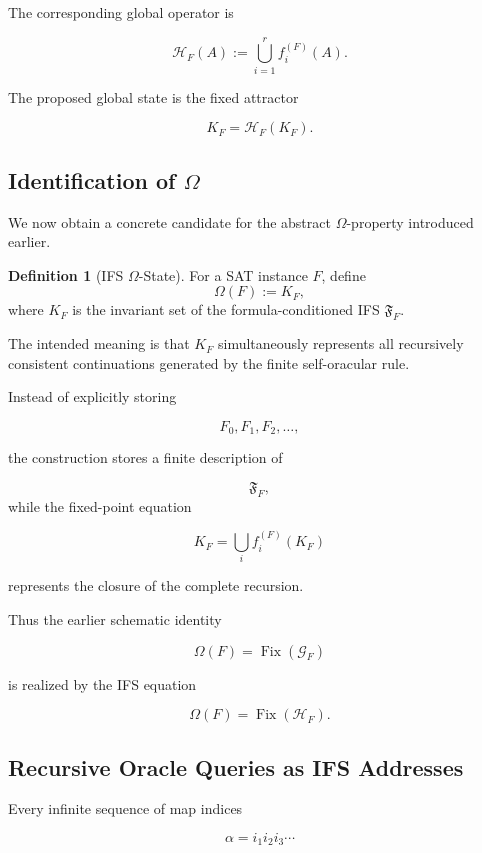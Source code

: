 \documentclass[11pt]{article}
\theoremstyle{plain}
\theoremstyle{definition}
\newtheorem{definition}[theorem]{Definition}
\begin{document}
The corresponding global operator is

\[
    \mathcal{H}_F(A)
    :=
    \bigcup_{i=1}^{r}
    f_i^{(F)}(A).
\]

The proposed global state is the fixed attractor

\[
    \boxed{
    K_F
    =
    \mathcal{H}_F(K_F).
    }
\]

\subsection{Identification of \texorpdfstring{\(\Omega\)}{Omega}}

We now obtain a concrete candidate for the abstract
\(\Omega\)-property introduced earlier.

\begin{definition}[IFS \(\Omega\)-State]
\label{def:ifs-omega-state}
For a SAT instance \(F\), define
\[
    \Omega(F)
    :=
    K_F,
\]
where \(K_F\) is the invariant set of the formula-conditioned IFS
\(\mathfrak{F}_F\).
\end{definition}

The intended meaning is that \(K_F\) simultaneously represents all
recursively consistent continuations generated by the finite self-oracular
rule.

Instead of explicitly storing

\[
    F_0,F_1,F_2,\dots,
\]

the construction stores a finite description of

\[
    \mathfrak{F}_F,
\]
while the fixed-point equation

\[
    K_F
    =
    \bigcup_i f_i^{(F)}(K_F)
\]

represents the closure of the complete recursion.

Thus the earlier schematic identity

\[
    \Omega(F)
    =
    \operatorname{Fix}(\mathcal{G}_F)
\]

is realized by the IFS equation

\[
\boxed{
\Omega(F)
=
\operatorname{Fix}(\mathcal{H}_F).
}
\]

\subsection{Recursive Oracle Queries as IFS Addresses}

Every infinite sequence of map indices

\[
    \alpha
    =
    i_1i_2i_3\cdots
\]
\end{document}
